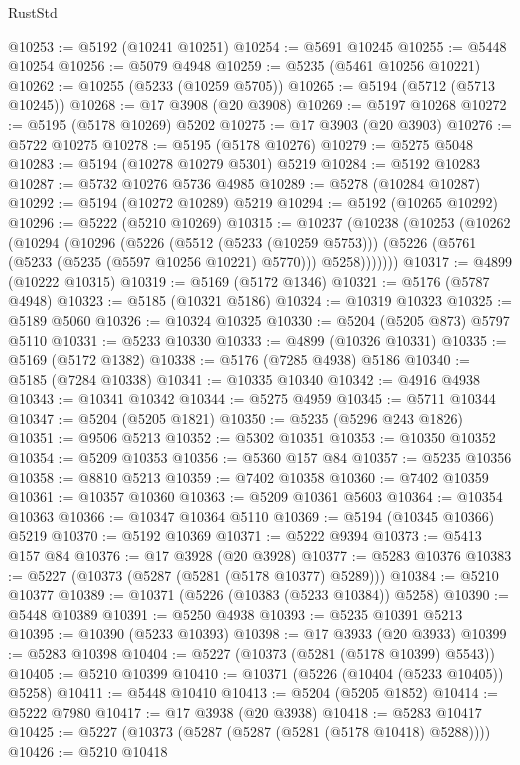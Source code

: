 \begin{lexlean}{RustStd}
\begin{coremodule}
@10253 := @5192 (@10241 @10251)
@10254 := @5691 @10245
@10255 := @5448 @10254
@10256 := @5079 @4948
@10259 := @5235 (@5461 @10256 @10221)
@10262 := @10255 (@5233 (@10259 @5705))
@10265 := @5194 (@5712 (@5713 @10245))
@10268 := @17 @3908 (@20 @3908)
@10269 := @5197 @10268
@10272 := @5195 (@5178 @10269) @5202
@10275 := @17 @3903 (@20 @3903)
@10276 := @5722 @10275
@10278 := @5195 (@5178 @10276)
@10279 := @5275 @5048
@10283 := @5194 (@10278 @10279 @5301) @5219
@10284 := @5192 @10283
@10287 := @5732 @10276 @5736 @4985
@10289 := @5278 (@10284 @10287)
@10292 := @5194 (@10272 @10289) @5219
@10294 := @5192 (@10265 @10292)
@10296 := @5222 (@5210 @10269)
@10315 := @10237
    (@10238
      (@10253
        (@10262
          (@10294
            (@10296
              (@5226
                (@5512 (@5233 (@10259 @5753)))
                (@5226 (@5761 (@5233 (@5235 (@5597 @10256 @10221) @5770))) @5258)))))))
@10317 := @4899 (@10222 @10315)
@10319 := @5169 (@5172 @1346)
@10321 := @5176 (@5787 @4948)
@10323 := @5185 (@10321 @5186)
@10324 := @10319 @10323
@10325 := @5189 @5060
@10326 := @10324 @10325
@10330 := @5204 (@5205 @873) @5797 @5110
@10331 := @5233 @10330
@10333 := @4899 (@10326 @10331)
@10335 := @5169 (@5172 @1382)
@10338 := @5176 (@7285 @4938) @5186
@10340 := @5185 (@7284 @10338)
@10341 := @10335 @10340
@10342 := @4916 @4938
@10343 := @10341 @10342
@10344 := @5275 @4959
@10345 := @5711 @10344
@10347 := @5204 (@5205 @1821)
@10350 := @5235 (@5296 @243 @1826)
@10351 := @9506 @5213
@10352 := @5302 @10351
@10353 := @10350 @10352
@10354 := @5209 @10353
@10356 := @5360 @157 @84
@10357 := @5235 @10356
@10358 := @8810 @5213
@10359 := @7402 @10358
@10360 := @7402 @10359
@10361 := @10357 @10360
@10363 := @5209 @10361 @5603
@10364 := @10354 @10363
@10366 := @10347 @10364 @5110
@10369 := @5194 (@10345 @10366) @5219
@10370 := @5192 @10369
@10371 := @5222 @9394
@10373 := @5413 @157 @84
@10376 := @17 @3928 (@20 @3928)
@10377 := @5283 @10376
@10383 := @5227 (@10373 (@5287 (@5281 (@5178 @10377) @5289)))
@10384 := @5210 @10377
@10389 := @10371 (@5226 (@10383 (@5233 @10384)) @5258)
@10390 := @5448 @10389
@10391 := @5250 @4938
@10393 := @5235 @10391 @5213
@10395 := @10390 (@5233 @10393)
@10398 := @17 @3933 (@20 @3933)
@10399 := @5283 @10398
@10404 := @5227 (@10373 (@5281 (@5178 @10399) @5543))
@10405 := @5210 @10399
@10410 := @10371 (@5226 (@10404 (@5233 @10405)) @5258)
@10411 := @5448 @10410
@10413 := @5204 (@5205 @1852)
@10414 := @5222 @7980
@10417 := @17 @3938 (@20 @3938)
@10418 := @5283 @10417
@10425 := @5227 (@10373 (@5287 (@5287 (@5281 (@5178 @10418) @5288))))
@10426 := @5210 @10418

\end{coremodule}
\end{lexlean}
